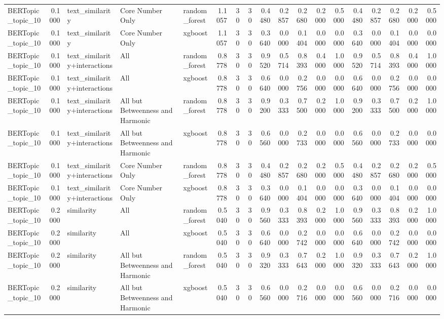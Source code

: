 \begin{tabular}{lrlllrrrrrrrrrrrrr}
BERTopic_topic_10 & 0.1000 & text_similarity & Core Number Only & random_forest & 1.1057 & 30 & 30 & 0.4480 & 0.2857 & 0.2680 & 0.2000 & 0.5000 & 0.4480 & 0.2857 & 0.2680 & 0.2000 & 0.5000 \\
BERTopic_topic_10 & 0.1000 & text_similarity & Core Number Only & xgboost & 1.1057 & 30 & 30 & 0.3640 & 0.0000 & 0.1404 & 0.0000 & 0.0000 & 0.3640 & 0.0000 & 0.1404 & 0.0000 & 0.0000 \\
BERTopic_topic_10 & 0.1000 & text_similarity+interactions & All & random_forest & 0.8778 & 30 & 30 & 0.9520 & 0.5714 & 0.8393 & 0.4000 & 1.0000 & 0.9520 & 0.5714 & 0.8393 & 0.4000 & 1.0000 \\
BERTopic_topic_10 & 0.1000 & text_similarity+interactions & All & xgboost & 0.8778 & 30 & 30 & 0.6640 & 0.0000 & 0.2756 & 0.0000 & 0.0000 & 0.6640 & 0.0000 & 0.2756 & 0.0000 & 0.0000 \\
BERTopic_topic_10 & 0.1000 & text_similarity+interactions & All but Betweenness and Harmonic & random_forest & 0.8778 & 30 & 30 & 0.9200 & 0.3333 & 0.7500 & 0.2000 & 1.0000 & 0.9200 & 0.3333 & 0.7500 & 0.2000 & 1.0000 \\
BERTopic_topic_10 & 0.1000 & text_similarity+interactions & All but Betweenness and Harmonic & xgboost & 0.8778 & 30 & 30 & 0.6560 & 0.0000 & 0.2733 & 0.0000 & 0.0000 & 0.6560 & 0.0000 & 0.2733 & 0.0000 & 0.0000 \\
BERTopic_topic_10 & 0.1000 & text_similarity+interactions & Core Number Only & random_forest & 0.8778 & 30 & 30 & 0.4480 & 0.2857 & 0.2680 & 0.2000 & 0.5000 & 0.4480 & 0.2857 & 0.2680 & 0.2000 & 0.5000 \\
BERTopic_topic_10 & 0.1000 & text_similarity+interactions & Core Number Only & xgboost & 0.8778 & 30 & 30 & 0.3640 & 0.0000 & 0.1404 & 0.0000 & 0.0000 & 0.3640 & 0.0000 & 0.1404 & 0.0000 & 0.0000 \\
BERTopic_topic_10 & 0.2000 & similarity & All & random_forest & 0.5040 & 30 & 30 & 0.9560 & 0.3333 & 0.8393 & 0.2000 & 1.0000 & 0.9560 & 0.3333 & 0.8393 & 0.2000 & 1.0000 \\
BERTopic_topic_10 & 0.2000 & similarity & All & xgboost & 0.5040 & 30 & 30 & 0.6640 & 0.0000 & 0.2742 & 0.0000 & 0.0000 & 0.6640 & 0.0000 & 0.2742 & 0.0000 & 0.0000 \\
BERTopic_topic_10 & 0.2000 & similarity & All but Betweenness and Harmonic & random_forest & 0.5040 & 30 & 30 & 0.9320 & 0.3333 & 0.7643 & 0.2000 & 1.0000 & 0.9320 & 0.3333 & 0.7643 & 0.2000 & 1.0000 \\
BERTopic_topic_10 & 0.2000 & similarity & All but Betweenness and Harmonic & xgboost & 0.5040 & 30 & 30 & 0.6560 & 0.0000 & 0.2716 & 0.0000 & 0.0000 & 0.6560 & 0.0000 & 0.2716 & 0.0000 & 0.0000 \\

\end{tabular}
